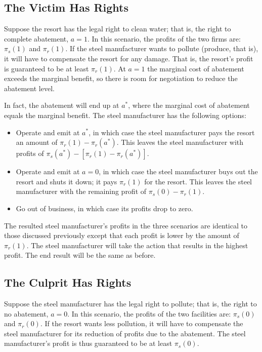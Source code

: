 \documentclass[
]{book}
\providecommand{\tightlist}{%
  \setlength{\itemsep}{0pt}\setlength{\parskip}{0pt}}
\begin{document}
\hypertarget{the-victim-has-rights}{%
\subsection{The Victim Has Rights}\label{the-victim-has-rights}}

Suppose the resort has the legal right to clean water; that is, the right to complete abatement, \(a=1\). In this scenario, the profits of the two firms are: \(\pi_s(1)\) and \(\pi_r(1)\). If the steel manufacturer wants to pollute (produce, that is), it will have to compensate the resort for any damage. That is, the resort's profit is guaranteed to be at least \(\pi_r(1)\). At \(a=1\) the marginal cost of abatement exceeds the marginal benefit, so there is room for negotiation to reduce the abatement level.

In fact, the abatement will end up at \(a^*\), where the marginal cost of abatement equals the marginal benefit. The steel manufacturer has the following options:

\begin{itemize}
\tightlist
\item
  Operate and emit at \(a^*\), in which case the steel manufacturer pays the resort an amount of \(\pi_r(1)-\pi_r(a^*)\). This leaves the steel manufacturer with profits of \(\pi_s(a^*)-[\pi_r(1)-\pi_r(a^*)]\).
\item
  Operate and emit at \(a=0\), in which case the steel manufacturer buys out the resort and shuts it down; it pays \(\pi_r(1)\) for the resort. This leaves the steel manufacturer with the remaining profit of \(\pi_s(0)-\pi_r(1)\).
\item
  Go out of business, in which case its profits drop to zero.
\end{itemize}

The resulted steel manufacturer's profits in the three scenarios are identical to those discussed previously except that each profit is lower by the amount of \(\pi_r(1)\). The steel manufacturer will take the action that results in the highest profit. The end result will be the same as before.

\hypertarget{the-culprit-has-rights}{%
\subsection{The Culprit Has Rights}\label{the-culprit-has-rights}}

Suppose the steel manufacturer has the legal right to pollute; that is, the right to no abatement, \(a=0\). In this scenario, the profits of the two facilities are: \(\pi_s(0)\) and \(\pi_r(0)\). If the resort wants less pollution, it will have to compensate the steel manufacturer for its reduction of profits due to the abatement. The steel manufacturer's profit is thus guaranteed to be at least \(\pi_s(0)\).
\end{document}
